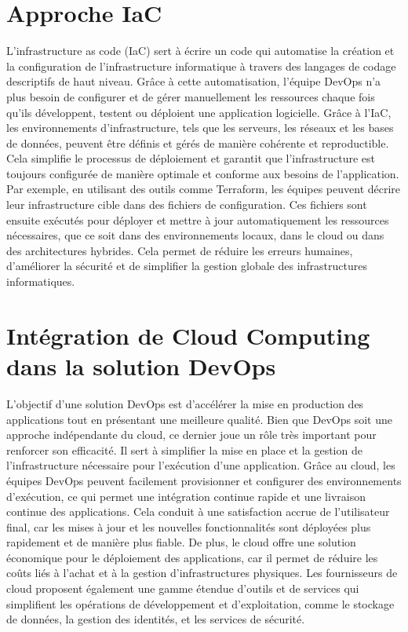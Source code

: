 \section{Approche IaC}
L’infrastructure as code (IaC) sert à écrire un code qui automatise la création et la configuration de l'infrastructure informatique à travers des langages de codage descriptifs de haut niveau. Grâce à cette automatisation, l'équipe DevOps n’a plus besoin de configurer et de gérer manuellement les ressources chaque fois qu’ils développent, testent ou déploient une application logicielle.
Grâce à l'IaC, les environnements d'infrastructure, tels que les serveurs, les réseaux et les bases de données, peuvent être définis et gérés de manière cohérente et reproductible. Cela simplifie le processus de déploiement et garantit que l'infrastructure est toujours configurée de manière optimale et conforme aux besoins de l'application. Par exemple, en utilisant des outils comme Terraform, les équipes peuvent décrire leur infrastructure cible dans des fichiers de configuration. Ces fichiers sont ensuite exécutés pour déployer et mettre à jour automatiquement les ressources nécessaires, que ce soit dans des environnements locaux, dans le cloud ou dans des architectures hybrides. Cela permet de réduire les erreurs humaines, d'améliorer la sécurité et de simplifier la gestion globale des infrastructures informatiques.

\section{Intégration de Cloud Computing dans la solution DevOps}
L’objectif d’une solution DevOps est d’accélérer la mise en production des applications tout en présentant une meilleure qualité. Bien que DevOps soit une approche indépendante du cloud, ce dernier joue un rôle très important pour renforcer son efficacité. Il sert à simplifier la mise en place et la gestion de l’infrastructure nécessaire pour l’exécution d’une application. Grâce au cloud, les équipes DevOps peuvent facilement provisionner et configurer des environnements d'exécution, ce qui permet une intégration continue rapide et une livraison continue des applications. Cela conduit à une satisfaction accrue de l'utilisateur final, car les mises à jour et les nouvelles fonctionnalités sont déployées plus rapidement et de manière plus fiable. De plus, le cloud offre une solution économique pour le déploiement des applications, car il permet de réduire les coûts liés à l'achat et à la gestion d'infrastructures physiques. Les fournisseurs de cloud proposent également une gamme étendue d'outils et de services qui simplifient les opérations de développement et d'exploitation, comme le stockage de données, la gestion des identités, et les services de sécurité.


